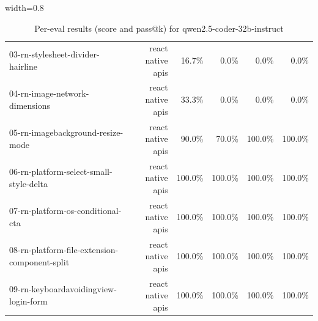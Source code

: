 \begin{table}[htbp]
\begin{adjustbox}{width=0.8\textwidth}
\begin{tabular}{lrrrrr}
03-rn-stylesheet-divider-hairline & react native apis & 16.7\% & 0.0\% & 0.0\% & 0.0\% \\
04-rn-image-network-dimensions & react native apis & 33.3\% & 0.0\% & 0.0\% & 0.0\% \\
05-rn-imagebackground-resize-mode & react native apis & 90.0\% & 70.0\% & 100.0\% & 100.0\% \\
06-rn-platform-select-small-style-delta & react native apis & 100.0\% & 100.0\% & 100.0\% & 100.0\% \\
07-rn-platform-os-conditional-cta & react native apis & 100.0\% & 100.0\% & 100.0\% & 100.0\% \\
08-rn-platform-file-extension-component-split & react native apis & 100.0\% & 100.0\% & 100.0\% & 100.0\% \\
09-rn-keyboardavoidingview-login-form & react native apis & 100.0\% & 100.0\% & 100.0\% & 100.0\% \\
\bottomrule
\end{tabular}
\end{adjustbox}
\caption{Per-eval results (score and pass@k) for qwen2.5-coder-32b-instruct}
\end{table}
